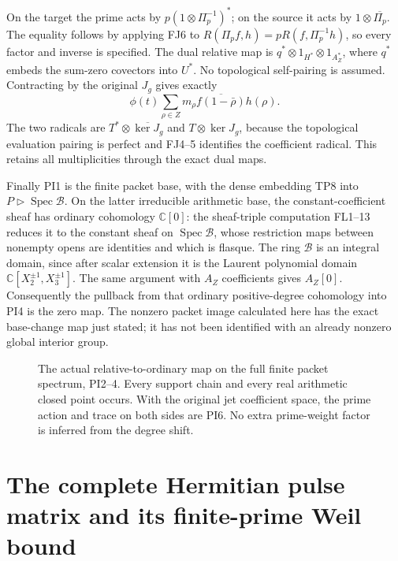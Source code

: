 \documentclass[11pt,a4paper]{article}
\theoremstyle{definition}\newtheorem{definition}[theorem]{Definition}
\newcommand{\C}{\mathbb C}\newcommand{\R}{\mathbb R}
\newcommand{\Spec}{\operatorname{Spec}}\newcommand{\SpecMon}{\operatorname{Spec}_{\mathrm{mon}}}
\begin{document}
On the target the prime acts by
$p(1\otimes\Pi_p^{-1})^*$; on the source it acts by
$1\otimes\overline{\Pi_p}$. The equality follows by applying
FJ6 to $R(\Pi_pf,h)=pR(f,\Pi_p^{-1}h)$, so every factor and
inverse is specified. The dual relative map is
$q^*\otimes1_{H^*}\otimes1_{A_Z^*}$, where $q^*$ embeds the
sum-zero covectors into $U^*$. No topological self-pairing is
assumed. Contracting by the original $J_g$ gives exactly
\[
 \phi(t)\sum_{\rho\in Z}m_\rho
       \overline{f(1-\bar\rho)}h(\rho).
 \tag{PI9}\label{pi:contracted-duality}
\]
The two radicals are $T^*\otimes\overline{\ker J_g}$ and
$T\otimes\ker J_g$, because the topological evaluation pairing
is perfect and FJ4--5 identifies the coefficient radical.
This retains all multiplicities through the exact dual maps.

Finally PI1 is the finite packet base, with the dense embedding
TP8 into $P\triangleright\Spec\mathcal B$. On the latter
irreducible arithmetic base, the constant-coefficient sheaf has
ordinary cohomology $\C[0]$: the sheaf-triple computation FL1--13
reduces it to the constant sheaf on $\Spec\mathcal B$, whose
restriction maps between nonempty opens are identities and
which is flasque. The ring $\mathcal B$ is an integral domain,
since after scalar extension it is the Laurent polynomial
domain $\C[X_2^{\pm1},X_3^{\pm1}]$. The same argument with
$A_Z$ coefficients gives $A_Z[0]$. Consequently the pullback
from that ordinary positive-degree cohomology into PI4 is the
zero map. The nonzero packet image calculated here has the exact
base-change map just stated; it has not been identified with
an already nonzero global interior group.

\begin{figure}[ht]
\centering
{}
\caption{The actual relative-to-ordinary map on the full finite
packet spectrum, PI2--4. Every support chain and every real
arithmetic closed point occurs. With the original jet coefficient
space, the prime action and trace on both sides are PI6.
No extra prime-weight factor is inferred from the degree shift.}
\end{figure}

\section{The complete Hermitian pulse matrix and its finite-prime Weil bound}
\end{document}
